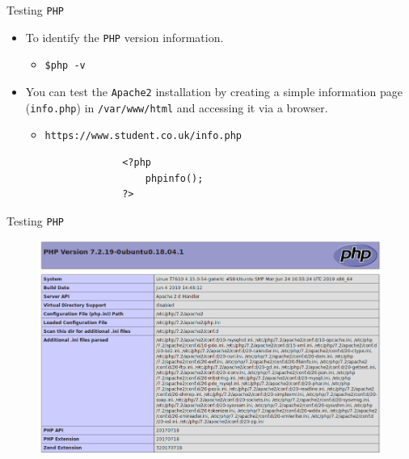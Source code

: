 \documentclass[xcolor=table,aspectratio=169]{beamer}
\begin{document}
\begin{frame}[fragile]{Testing \texttt{PHP}}
  \begin{itemize}
     \item To identify the \texttt{PHP} version information.
       \begin{itemize}
         \item \texttt{\$php -v}
       \end{itemize}
    \item You can test the \texttt{Apache2} installation by creating a simple information page (\texttt{info.php}) in \texttt{/var/www/html} and accessing it via a browser.
      \begin{itemize}
        \item \texttt{https://www.student.co.uk/info.php}
      \end{itemize}
  \end{itemize}
  \begin{tcolorbox}
    \lstset{
      basicstyle=\scriptsize\ttfamily,
    }
\begin{lstlisting}
                    <?php 
                        phpinfo(); 
                    ?>
\end{lstlisting}
  \end{tcolorbox}
\end{frame}

\begin{frame}{Testing \texttt{PHP}}
  \begin{figure}
    \begin{center}
      \includegraphics[width=0.6\linewidth]{phpinfo.png}
    \end{center}
  \end{figure}
\end{frame}
\end{document}
